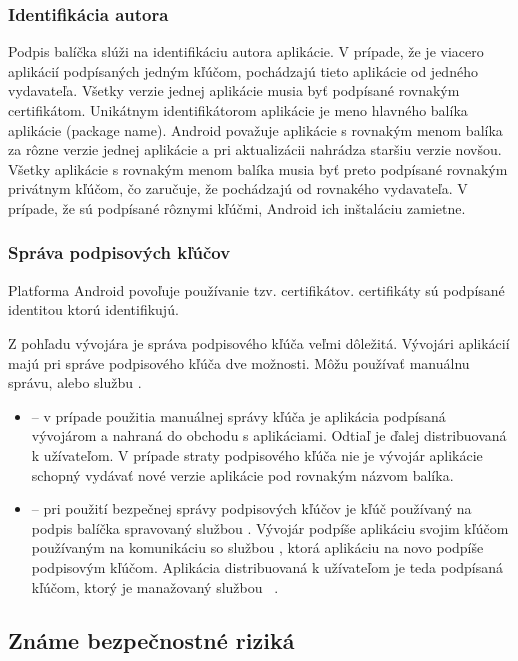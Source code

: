 \subsubsection{\textbf{Identifikácia autora}}
Podpis balíčka slúži na identifikáciu autora aplikácie. V prípade, že je viacero aplikácií podpísaných jedným kľúčom, pochádzajú tieto aplikácie od jedného vydavateľa. 
Všetky verzie jednej aplikácie musia byť podpísané rovnakým certifikátom. Unikátnym identifikátorom aplikácie je meno hlavného balíka aplikácie (package name). Android považuje aplikácie s rovnakým menom balíka za rôzne verzie jednej aplikácie a pri aktualizácii nahrádza staršiu verzie novšou. Všetky aplikácie s rovnakým menom balíka musia byť preto podpísané rovnakým privátnym kľúčom, čo zaručuje, že pochádzajú od rovnakého vydavateľa.  V prípade, že sú podpísané rôznymi kľúčmi, Android ich inštaláciu zamietne. 

\subsubsection{\textbf{Správa podpisových kľúčov}}
Platforma Android povoľuje používanie tzv.  certifikátov.  certifikáty sú podpísané identitou ktorú identifikujú. 

Z pohľadu vývojára je správa podpisového kľúča veľmi dôležitá. Vývojári aplikácií majú pri správe podpisového kľúča dve možnosti. Môžu používať manuálnu správu, alebo službu . 
\begin{itemize}
	\item {} -- v prípade použitia manuálnej správy kľúča je aplikácia podpísaná vývojárom a nahraná do obchodu s aplikáciami. Odtiaľ je ďalej distribuovaná k užívateľom. V prípade straty podpisového kľúča nie je vývojár aplikácie schopný vydávať nové verzie aplikácie pod rovnakým názvom balíka.
	\item {} -- pri použití bezpečnej správy podpisových kľúčov  je kľúč používaný na podpis balíčka spravovaný službou  . Vývojár podpíše aplikáciu svojim kľúčom používaným na komunikáciu so službou  , ktorá aplikáciu na novo podpíše podpisovým kľúčom. Aplikácia distribuovaná k užívateľom je teda podpísaná kľúčom, ktorý je manažovaný službou ~\cite{NT0FrzQIkOAYbG2G}. 
\end{itemize}


\subsection{Známe bezpečnostné riziká}

